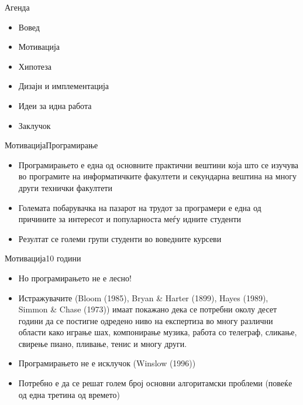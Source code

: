 
\begin{frame}{Агенда}
	\begin{itemize}
	  \item Вовед
	  \item Мотивација
	  \item Хипотеза
	  \item Дизајн и имплементација
	  \item Идеи за идна работа
	  \item Заклучок
	\end{itemize}
\end{frame}

\begin{frame}{Мотивација}{Програмирање}
    \begin{itemize}
      \item Програмирањето е една од основните практични вештини која што се
      изучува во програмите на информатичките факултети и секундарна вештина на
      многу други технички факултети
      \item Големата побарувачка на пазарот на трудот за програмери е една од
      причините за интересот и популарноста меѓу идните студенти
      \item Резултат се големи групи студенти во воведните курсеви
    \end{itemize}
\end{frame}

\begin{frame}{Мотивација}{10 години}
\begin{itemize}
  \item Но програмирањето не е лесно!
  \item Истражувачите (Bloom (1985), Bryan \& Harter (1899), Hayes (1989),
  Simmon \& Chase (1973)) имаат покажано дека се потребни околу десет години
  да се постигне одредено ниво на експертиза во многу различни области како играње
  шах, компонирање музика, работа со телеграф, сликање, свирење пиано, пливање,
  тенис и многу други.
  \item Програмирањето не е исклучок (Winslow (1996))
  \item Потребно е да се решат голем број основни алгоритамски проблеми
      (повеќе од една третина од времето)
\end{itemize}

\end{frame}

